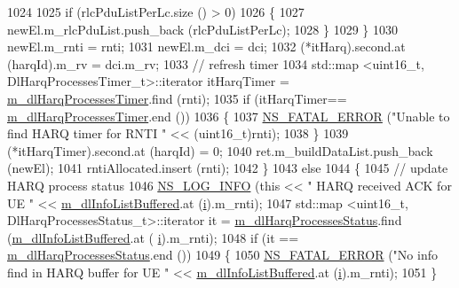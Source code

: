 \begin{DoxyCode}
1024 
1025               \textcolor{keywordflow}{if} (rlcPduListPerLc.size () > 0)
1026                 \{
1027                   newEl.m\_rlcPduList.push\_back (rlcPduListPerLc);
1028                 \}
1029             \}
1030           newEl.m\_rnti = rnti;
1031           newEl.m\_dci = dci;
1032           (*itHarq).second.at (harqId).m\_rv = dci.m\_rv;
1033           \textcolor{comment}{// refresh timer}
1034           std::map <uint16\_t, DlHarqProcessesTimer\_t>::iterator itHarqTimer = 
      \hyperlink{classns3_1_1PfFfMacScheduler_ab115ef9abb936f35aeb5979a8ed8928d}{m\_dlHarqProcessesTimer}.find (rnti);
1035           \textcolor{keywordflow}{if} (itHarqTimer== \hyperlink{classns3_1_1PfFfMacScheduler_ab115ef9abb936f35aeb5979a8ed8928d}{m\_dlHarqProcessesTimer}.end ())
1036             \{
1037               \hyperlink{group__fatal_ga5131d5e3f75d7d4cbfd706ac456fdc85}{NS\_FATAL\_ERROR} (\textcolor{stringliteral}{"Unable to find HARQ timer for RNTI "} << (uint16\_t)rnti);
1038             \}
1039           (*itHarqTimer).second.at (harqId) = 0;
1040           ret.m\_buildDataList.push\_back (newEl);
1041           rntiAllocated.insert (rnti);
1042         \}
1043       \textcolor{keywordflow}{else}
1044         \{
1045           \textcolor{comment}{// update HARQ process status}
1046           \hyperlink{group__logging_gafbd73ee2cf9f26b319f49086d8e860fb}{NS\_LOG\_INFO} (\textcolor{keyword}{this} << \textcolor{stringliteral}{" HARQ received ACK for UE "} << 
      \hyperlink{classns3_1_1PfFfMacScheduler_af3c266623addc28fc6ecd97901183a2f}{m\_dlInfoListBuffered}.at (\hyperlink{bernuolliDistribution_8m_a6f6ccfcf58b31cb6412107d9d5281426}{i}).m\_rnti);
1047           std::map <uint16\_t, DlHarqProcessesStatus\_t>::iterator it = 
      \hyperlink{classns3_1_1PfFfMacScheduler_a438c2319e01eaac65f64cbd82b3e8089}{m\_dlHarqProcessesStatus}.find (\hyperlink{classns3_1_1PfFfMacScheduler_af3c266623addc28fc6ecd97901183a2f}{m\_dlInfoListBuffered}.at (
      \hyperlink{bernuolliDistribution_8m_a6f6ccfcf58b31cb6412107d9d5281426}{i}).m\_rnti);
1048           \textcolor{keywordflow}{if} (it == \hyperlink{classns3_1_1PfFfMacScheduler_a438c2319e01eaac65f64cbd82b3e8089}{m\_dlHarqProcessesStatus}.end ())
1049             \{
1050               \hyperlink{group__fatal_ga5131d5e3f75d7d4cbfd706ac456fdc85}{NS\_FATAL\_ERROR} (\textcolor{stringliteral}{"No info find in HARQ buffer for UE "} << 
      \hyperlink{classns3_1_1PfFfMacScheduler_af3c266623addc28fc6ecd97901183a2f}{m\_dlInfoListBuffered}.at (\hyperlink{bernuolliDistribution_8m_a6f6ccfcf58b31cb6412107d9d5281426}{i}).m\_rnti);
1051             \}

\end{DoxyCode}
